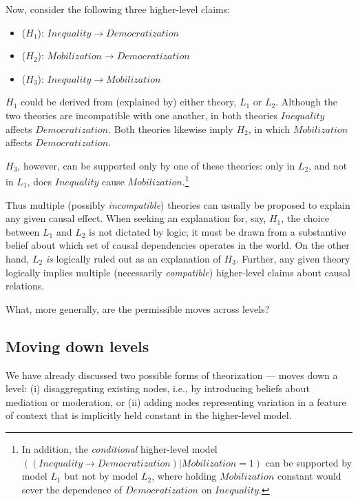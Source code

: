 \documentclass[
  12pt,
]{book}
\providecommand{\tightlist}{%
  \setlength{\itemsep}{0pt}\setlength{\parskip}{0pt}}
\begin{document}
Now, consider the following three higher-level claims:

\begin{itemize}
\tightlist
\item
  (\(H_1\)): \(Inequality \rightarrow Democratization\)
\item
  (\(H_2\)): \(Mobilization \rightarrow Democratization\)
\item
  (\(H_3\)): \(Inequality \rightarrow Mobilization\)
\end{itemize}

\(H_1\) could be derived from (explained by) either theory, \(L_1\) or \(L_2\). Although the two theories are incompatible with one another, in both theories \(Inequality\) affects \(Democratization\). Both theories likewise imply \(H_2\), in which \(Mobilization\) affects \(Democratization\).

\(H_3\), however, can be supported only by one of these theories: only in \(L_2\), and not in \(L_1\), does \(Inequality\) cause \(Mobilization\).\footnote{In addition, the \emph{conditional} higher-level model \(((Inequality \rightarrow Democratization)|Mobilization=1)\) can be supported by model \(L_1\) but not by model \(L_2\), where holding \(Mobilization\) constant would sever the dependence of \(Democratization\) on \(Inequality\).}

Thus multiple (possibly \emph{incompatible}) theories can usually be proposed to explain any given causal effect. When seeking an explanation for, say, \(H_1\), the choice between \(L_1\) and \(L_2\) is not dictated by logic; it must be drawn from a substantive belief about which set of causal dependencies operates in the world. On the other hand, \(L_2\) \emph{is} logically ruled out as an explanation of \(H_3\). Further, any given theory logically implies multiple (necessarily \emph{compatible}) higher-level claims about causal relations.

What, more generally, are the permissible moves across levels?

\hypertarget{moving-down-levels}{%
\subsection{Moving down levels}\label{moving-down-levels}}

We have already discussed two possible forms of theorization --- moves down a level: (i) disaggregating existing nodes, i.e., by introducing beliefs about mediation or moderation, or (ii) adding nodes representing variation in a feature of context that is implicitly held constant in the higher-level model.
\end{document}
